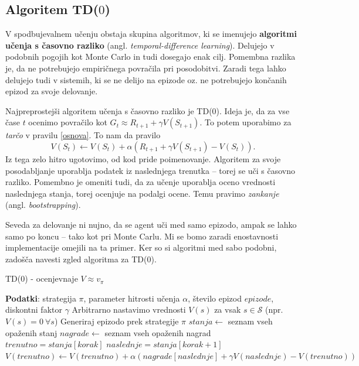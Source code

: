 \documentclass[12pt,a4paper]{amsart}
\theoremstyle{definition} %
\theoremstyle{plain} %
\begin{document}
\subsection{Algoritem TD($0$)}
V spodbujevalnem učenju obstaja skupina algoritmov, ki se imenujejo \textbf{algoritmi učenja s 
časovno razliko} (angl. \textit{temporal-difference learning}). Delujejo v podobnih pogojih kot 
Monte Carlo in tudi dosegajo enak cilj. Pomembna razlika je, da ne potrebujejo empiričnega povračila 
pri posodobitvi. Zaradi tega lahko delujejo tudi v sistemih, ki se ne delijo na epizode oz. ne 
potrebujejo končanih epizod za svoje delovanje.

Najpreprostejši algoritem učenja s časovno razliko je TD($0$). Ideja je, da za vse čase $t$ ocenimo
povračilo kot $G_t \approx R_{t+1} + \gamma V(S_{t+1}).$ To potem uporabimo za \textit{tarčo}
v pravilu \eqref{osnova}. To nam da pravilo
\begin{equation}
    V(S_t) \leftarrow V(S_t) + \alpha (R_{t+1} + \gamma V(S_{t+1}) - V(S_t)).
\end{equation}
Iz tega zelo hitro ugotovimo, od kod pride poimenovanje. Algoritem za svoje posodabljanje uporablja 
podatek iz naslednjega trenutka -- torej se uči s časovno razliko. Pomembno je omeniti tudi, da za 
učenje uporablja oceno vrednosti naslednjega stanja, torej ocenjuje na podalgi ocene. Temu pravimo 
\textit{zankanje} (angl. \textit{bootstrapping}). 

Seveda za delovanje ni nujno, da se agent uči med samo epizodo, ampak se lahko samo po koncu -- tako 
kot pri Monte Carlu. Mi se bomo zaradi enostavnosti implementacije omejili na ta primer. Ker so si 
algoritmi med sabo podobni, zadošča navesti zgled algoritma za TD($0$).

\begin{algorithm}[H]
    \caption{TD($0$) - ocenjevnaje  $V \approx v_\pi$}
\begin{algorithmic}
    
    \STATE \textbf{Podatki}: strategija $\pi$, parameter hitrosti učenja $\alpha$, število epizod $epizode$, 
            diskontni faktor $\gamma$
    \STATE 
    \STATE Arbitrarno nastavimo vrednosti $V(s)$ za vsak $s \in \mathcal{S}$ (npr. $V(s) = 0~\forall s$)
    \STATE
        \STATE Generiraj epizodo prek strategije $\pi$
        \STATE $stanja \leftarrow$ seznam vseh opaženih stanj
        \STATE $nagrade \leftarrow$ seznam vseh opaženih nagrad
        \STATE
        \STATE $trenutno = stanja[korak]$
        \STATE $naslednje = stanja[korak + 1]$
        \STATE $V(trenutno) \leftarrow V(trenutno) + \alpha (nagrade[naslednje] + \gamma V(naslednje) - 
        V(trenutno))$ 
        \ENDFOR
    \ENDFOR

\end{algorithmic}
\end{algorithm}
\end{document}
